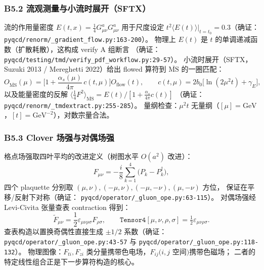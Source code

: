 \documentclass[UTF8]{ctexart}
\begin{document}
\subsubsection{B5.2 流观测量与小流时展开（SFTX）}
流的作用量密度 $E(t,x)=\frac14 G^a_{\mu\nu}G^a_{\mu\nu}$ 用于尺度设定
$t^2\langle E(t)\rangle|_{t=t_0}=0.3$（确证：
\texttt{\nolinkurl{pyqcd/renorm/_gradient_flow.py:163-200}}）。
物理上 $E(t)$ 是 $t$ 的单调递减函数（扩散耗散），这构成 verify A 组断言
（确证：\texttt{\nolinkurl{pyqcd/testing/tmd/verify_pdf_workflow.py:29-57}}）。
小流时展开（SFTX，Suzuki 2013 / Mereghetti 2022）给出 flowed 算符到
$\overline{\mathrm{MS}}$ 的一圈匹配：
\begin{equation}
O_{\overline{\mathrm{MS}}}(\mu)=\Big[1+\frac{\alpha_s(\mu)}{4\pi}\,c(t,\mu)\Big]O_{\mathrm{flow}}(t),\qquad
c(t,\mu)=2b_0\big[\ln(2\mu^2 t)+\gamma_E\big],
\label{eq:sftx}
\end{equation}
以及能量密度的反解 $\langle\tfrac14 F^2\rangle_{\overline{\mathrm{MS}}}
=E(t)/[1+\frac{\alpha_s}{4\pi}c(t)]$
（确证：\texttt{\nolinkurl{pyqcd/renorm/_tmdextract.py:255-285}}）。
量纲检查：$\mu^2 t$ 无量纲（$[\mu]=\mathrm{GeV}$，$[t]=\mathrm{GeV}^{-2}$），对数宗量合法。

\subsubsection{B5.3 Clover 场强与对偶场强}
格点场强取四叶平均的改进定义（树图水平 $O(a^2)$ 改进）：
\begin{equation}
F_{\mu\nu}=-\frac{i}{8}\sum_{k=1}^{4}\big(P_k-P_k^\dagger\big),
\label{eq:clover}
\end{equation}
四个 plaquette 分别取 $(\mu,\nu),(-\mu,\nu),(-\mu,-\nu),(\mu,-\nu)$ 方位，
保证在平移/反射下对称（确证：
\texttt{\nolinkurl{pyqcd/operator/_gluon_ope.py:63-115}}）。
对偶场强经 Levi-Civita 张量查表 contraction 得到：
\begin{equation}
\tilde F_{\mu\nu}=\frac12\varepsilon_{\mu\nu\rho\sigma}F_{\rho\sigma},
\qquad
\texttt{Tensor4}[\mu,\nu,\rho,\sigma]=\tfrac12\varepsilon_{\mu\nu\rho\sigma}.
\label{eq:dual}
\end{equation}
查表构造以置换奇偶性直接生成 $\pm1/2$ 系数（确证：
\texttt{\nolinkurl{pyqcd/operator/_gluon_ope.py:43-57}} 与
\texttt{\nolinkurl{pyqcd/operator/_gluon_ope.py:118-132}}）。
物理图像：$F_{ti},F_{zi}$ 类分量携带色电场，$F_{ij}(i,j$ 空间$)$携带色磁场；
二者的特定线性组合正是下一步算符构造的核心。
\end{document}
